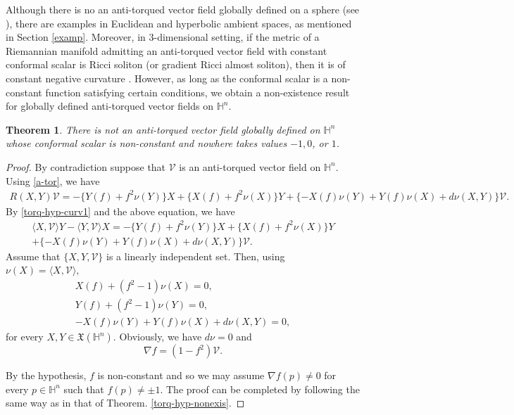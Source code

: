 \documentclass[12pt]{amsart}
\def\h{\mathbb H}
\newtheorem{theorem}{Theorem}[section]
\theoremstyle{definition}
\begin{document}
Although there is no an anti-torqued vector field globally defined on a sphere (see \cite{dan}), there are examples in Euclidean and hyperbolic ambient spaces, as mentioned in Section \ref{examp}. Moreover, in $3$-dimensional setting, if the metric of a Riemannian manifold admitting an anti-torqued vector field with constant conformal scalar is Ricci soliton (or gradient Ricci almost soliton), then it is of constant negative curvature \cite{na}. However, as long as the conformal scalar is a non-constant function satisfying certain conditions, we obtain a non-existence result for globally defined anti-torqued vector fields on $\h^n$.


\begin{theorem}  \label{anti-hyp-nonexis}
There is not an anti-torqued vector field globally defined on $\h^n$ whose conformal scalar is non-constant and nowhere takes values $-1,0$, or $1$.
\end{theorem}

\begin{proof}
By contradiction suppose that $\mathcal{V}$ is an anti-torqued vector field on $\h^n$. Using \eqref{a-tor}, we have
\begin{eqnarray*} \label{anti-hyp}
R(X,Y)\mathcal{V}=-\{ Y(f)+f^{2}\nu (Y)\} X+\{ X(f)+f^{2}\nu(X)\} Y  +\{ -X(f)\nu (Y)+Y(f)\nu (X)+d\nu (X,Y)\} \mathcal{V}. 
\end{eqnarray*}%
By \eqref{torq-hyp-curv1} and the above equation, we have%
\begin{eqnarray*}  \label{anti-hyp2}
\langle X,\mathcal{V}\rangle Y-\langle Y,\mathcal{V}\rangle X =-\{ Y(f)+f^2\nu (Y)\} X+\{
X(f)+f^2\nu (X)\} Y   \\
+\{ -X(f)\nu (Y)+Y(f)\nu (X)+d\nu (X,Y)\} \mathcal{V}. 
\nonumber
\end{eqnarray*}%
Assume that $\{ X,Y,\mathcal{V}\} $ is a linearly independent set. Then, using $\nu (X)=\langle X,\mathcal{V}\rangle ,$  
\begin{eqnarray*}
X(f)+\left( f^{2}-1\right) \nu (X) =0, \\
Y(f)+\left( f^{2}-1\right) \nu (Y) =0, \\
-X(f)\nu (Y)+Y(f)\nu (X)+d\nu (X,Y) =0,
\end{eqnarray*}%
for every $X,Y\in \mathfrak{X}(\h^n).$ Obviously, we
have $d\nu =0$ and
\begin{equation*}
\nabla f=(1-f^{2})\mathcal{V}. \end{equation*}

By the hypothesis, $f$ is non-constant and so we may assume $\nabla f(p)\neq 0$ for every $p \in \h^n$ such that $f(p) \neq \pm 1$. The proof can be completed by following the same way as in that of Theorem. \ref{torq-hyp-nonexis}.
\end{proof}
\end{document}
